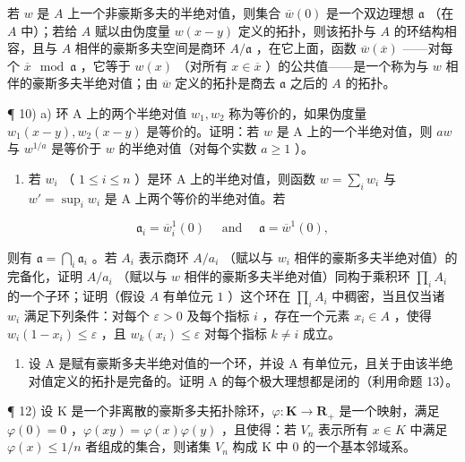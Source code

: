 若 \(w\) 是 \(A\) 上一个非豪斯多夫的半绝对值，则集合 \(\overline{w}(0)\) 是一个双边理想 \(\mathfrak{a}\) （在 \(A\) 中）；若给 \(A\) 赋以由伪度量 \(w(x - y)\) 定义的拓扑，则该拓扑与 \(A\) 的环结构相容，且与 \(A\) 相伴的豪斯多夫空间是商环 \(A / \mathfrak{a}\) ，在它上面，函数 \(\overline{w}(\overline{x})\) ——对每个 \(\overline{x} \mod \mathfrak{a}\) ，它等于 \(w(x)\) （对所有 \(x \in \overline{x}\) ）的公共值——是一个称为与 \(w\) 相伴的豪斯多夫半绝对值；由 \(\overline{w}\) 定义的拓扑是商去 \(\mathfrak{a}\) 之后的 \(A\) 的拓扑。

¶ 10) a) 环 A 上的两个半绝对值 \(w_1, w_2\) 称为等价的，如果伪度量 \(w_1(x - y), w_2(x - y)\) 是等价的。证明：若 \(w\) 是 A 上的一个半绝对值，则 \(aw\) 与 \(w^{1/a}\) 是等价于 \(w\) 的半绝对值（对每个实数 \(a \geqslant 1\) ）。

\begin{enumerate}
\def\labelenumi{\alph{enumi})}
\setcounter{enumi}{1}
\tightlist
\item
  若 \(w_{i}\) （ \(1 \leqslant i \leqslant n\) ）是环 A 上的半绝对值，则函数 \(w = \sum_{i} w_{i}\) 与 \(w' = \sup_{i} w_{i}\) 是 A 上两个等价的半绝对值。若
\end{enumerate}

\[
\mathfrak {a} _ {i} = \overline {{{w}}} _ {i} ^ {1} (\mathrm{0}) \quad \text { and } \quad \mathfrak {a} = \overline {{{w}}} ^ {1} (\mathrm{0}),
\]

则有 \(\mathfrak{a} = \bigcap_{i} \mathfrak{a}_{i}\) 。若 \(A_i\) 表示商环 \(A/a_i\) （赋以与 \(w_i\) 相伴的豪斯多夫半绝对值）的完备化，证明 \(A/a_i\) （赋以与 \(w\) 相伴的豪斯多夫半绝对值）同构于乘积环 \(\prod_{i} A_i\) 的一个子环；证明（假设 \(A\) 有单位元 \(1\) ）这个环在 \(\prod_{i} A_i\) 中稠密，当且仅当诸 \(w_i\) 满足下列条件：对每个 \(\varepsilon > 0\) 及每个指标 \(i\) ，存在一个元素 \(x_i \in A\) ，使得 \(w_i(1 - x_i) \leqslant \varepsilon\) ，且 \(w_k(x_i) \leqslant \varepsilon\) 对每个指标 \(k \neq i\) 成立。

\begin{enumerate}
\def\labelenumi{\arabic{enumi})}
\setcounter{enumi}{10}
\tightlist
\item
  设 A 是赋有豪斯多夫半绝对值的一个环，并设 A 有单位元，且关于由该半绝对值定义的拓扑是完备的。证明 A 的每个极大理想都是闭的（利用命题 13）。
\end{enumerate}

¶ 12) 设 K 是一个非离散的豪斯多夫拓扑除环，\(\varphi: \mathbf{K} \to \mathbf{R}_{+}\) 是一个映射，满足 \(\varphi(0) = 0\) ，\(\varphi(xy) = \varphi(x)\varphi(y)\) ，且使得：若 \(V_{n}\) 表示所有 \(x \in K\) 中满足 \(\varphi(x) \leqslant 1/n\) 者组成的集合，则诸集 \(V_{n}\) 构成 K 中 \(0\) 的一个基本邻域系。

